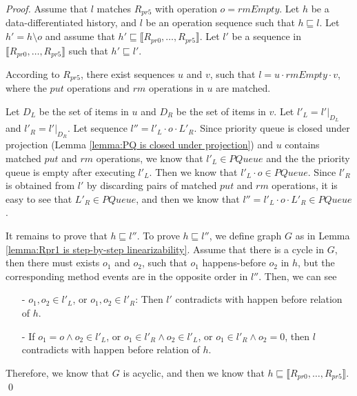 \begin {proof}

Assume that $l$ matches $R_{\textit{pr5}}$ with operation $o=\textit{rmEmpty}$. Let $h$ be a data-differentiated history, and $l$ be an operation sequence such that $h \sqsubseteq l$. Let $h'=h \setminus o$ and assume that $h' \sqsubseteq \llbracket R_{\textit{pr0}},\ldots,R_{\textit{pr5}} \rrbracket$. Let $l'$ be a sequence in $\llbracket R_{\textit{pr0}},\ldots,R_{\textit{pr5}} \rrbracket$ such that $h' \sqsubseteq l'$.




According to $R_{\textit{pr5}}$, there exist sequences $u$ and $v$, such that $l=u \cdot \textit{rmEmpty} \cdot v$, where the $\textit{put}$ operations and $\textit{rm}$ operations in $u$ are matched.

Let $D_L$ be the set of items in $u$ and $D_R$ be the set of items in $v$. Let $l'_L = l' \vert_{D_L}$ and $l'_R = l' \vert_{D_R}$. Let sequence $l'' = l'_L \cdot o \cdot L'_R$. Since priority queue is closed under projection (Lemma \ref{lemma:PQ is closed under projection}) and $u$ contains matched $\textit{put}$ and $\textit{rm}$ operations, we know that $l'_L \in \textit{PQueue}$ and the the priority queue is empty after executing $l'_L$. Then we know that $l'_L \cdot o \in \textit{PQueue}$. Since $l'_R$ is obtained from $l'$ by discarding pairs of matched $\textit{put}$ and $\textit{rm}$ operations, it is easy to see that $L'_R \in \textit{PQueue}$, and then we know that $l'' = l'_L \cdot o \cdot L'_R \in \textit{PQueue}$.

It remains to prove that $h \sqsubseteq l''$. To prove $h \sqsubseteq l''$, we define graph $G$ as in Lemma \ref{lemma:Rpr1 is step-by-step linearizability}. Assume that there is a cycle in $G$, then there must exists $o_1$ and $o_2$, such that $o_1$ happens-before $o_2$ in $h$, but the corresponding method events are in the opposite order in $l''$. Then, we can see

\begin{itemize}
\setlength{\itemsep}{0.5pt}
\item[-] $o_1,o_2 \in l'_L$, or $o_1,o_2 \in l'_R$: Then $l'$ contradicts with happen before relation of $h$.

\item[-] If $o_1=o \wedge o_2 \in l'_L$, or $o_1 \in l'_R \wedge o_2 \in l'_L$, or $o_1 \in l'_R \wedge o_2 = 0$, then $l$ contradicts with happen before relation of $h$.
\end{itemize}

Therefore, we know that $G$ is acyclic, and then we know that $h \sqsubseteq \llbracket R_{\textit{pr0}},\ldots,R_{\textit{pr5}} \rrbracket$. \qed
\end {proof}




